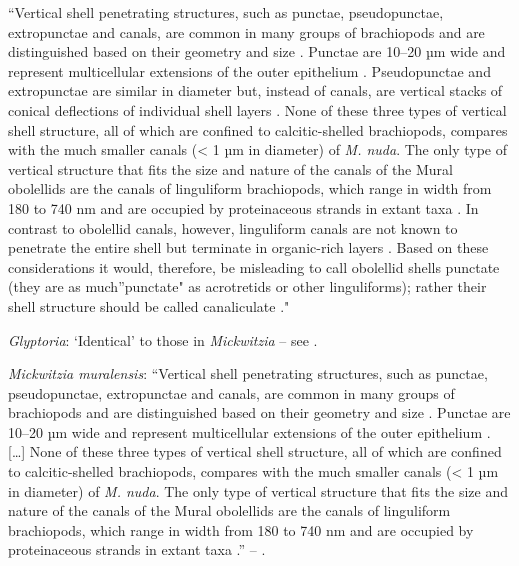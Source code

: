 \documentclass[openany]{book}
\theoremstyle{definition}
\theoremstyle{definition}
\theoremstyle{definition}
\theoremstyle{remark}
\begin{document}
``Vertical shell penetrating structures, such as punctae, pseudopunctae,
extropunctae and canals, are common in many groups of brachiopods and
are distinguished based on their geometry and size
\citep{Williams1997Introduction}. Punctae are 10--20 µm wide and
represent multicellular extensions of the outer epithelium
\citep{Owen1969Thecaecum}. Pseudopunctae and extropunctae are similar in
diameter but, instead of canals, are vertical stacks of conical
deflections of individual shell layers \citep{Williams1993Roleof}. None
of these three types of vertical shell structure, all of which are
confined to calcitic-shelled brachiopods, compares with the much smaller
canals (\textless{} 1 µm in diameter) of \emph{M. nuda}. The only type
of vertical structure that fits the size and nature of the canals of the
Mural obolellids are the canals of linguliform brachiopods, which range
in width from 180 to 740 nm and are occupied by proteinaceous strands in
extant taxa
\citep{Williams1992Structureof, Williams1994Collagenouschitino, Williams1997Introduction}.
In contrast to obolellid canals, however, linguliform canals are not
known to penetrate the entire shell but terminate in organic-rich layers
\citep{Williams1997Introduction}. Based on these considerations it
would, therefore, be misleading to call obolellid shells punctate (they
are as much''punctate" as acrotretids or other linguliforms); rather
their shell structure should be called canaliculate
\citep{Williams1997Introduction}."

\hypertarget{Glyptoria-coding-128}{}
\emph{Glyptoria}: `Identical' to those in \emph{Mickwitzia} -- see
\citet{Williams2007Supplement}.

\hypertarget{Mickwitzia_muralensis-coding-128}{}
\emph{Mickwitzia muralensis}: ``Vertical shell penetrating structures,
such as punctae, pseudopunctae, extropunctae and canals, are common in
many groups of brachiopods and are distinguished based on their geometry
and size \citep{Williams1997Introduction}. Punctae are 10--20 µm wide
and represent multicellular extensions of the outer epithelium
\citep{Owen1969Thecaecum}. {[}\ldots{}{]} None of these three types of
vertical shell structure, all of which are confined to calcitic-shelled
brachiopods, compares with the much smaller canals (\textless{} 1 µm in
diameter) of \emph{M. nuda}. The only type of vertical structure that
fits the size and nature of the canals of the Mural obolellids are the
canals of linguliform brachiopods, which range in width from 180 to 740
nm and are occupied by proteinaceous strands in extant taxa
\citetext{\citealp[1994]{Williams1992Structureof}; \citealp{Williams1997Introduction}}.''
-- \citet{Balthasar2008iMummpikia}.
\end{document}
